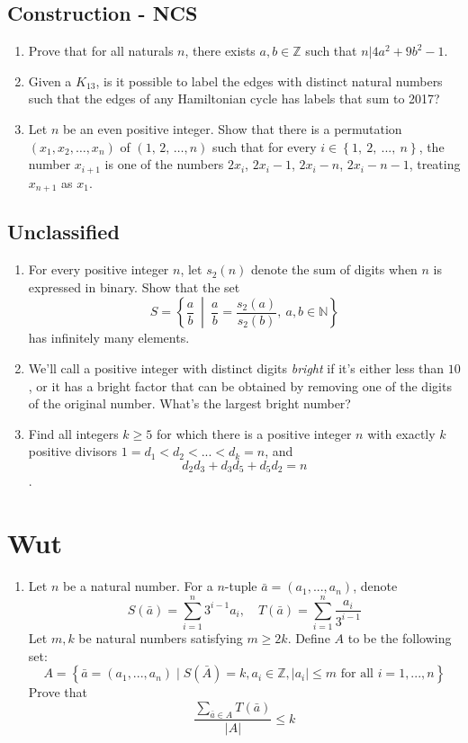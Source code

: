 \documentclass[a4paper]{article}
\newcommand{\sct}{\section}
\newcommand{\ssct}{\subsection}
\newcommand{\be}{\begin{enumerate}}
\newcommand{\ee}{\end{enumerate}}
\begin{document}
\ssct*{Construction - NCS}
\be
	\item Prove that for all naturals $n$, there exists $a,b\in\mathbb{Z}$ such that $n|4a^2+9b^2-1$.

    \item Given a $K_{13}$, is it possible to label the edges with distinct natural numbers such that the edges of any Hamiltonian cycle has labels that sum to 2017?

    \item Let $n$ be an even positive integer. Show that there is a permutation $\left(x_{1},x_{2},\ldots,x_{n}\right)$ of $\left(1,\,2,\,\ldots,n\right)$ such that for every $i\in\left\{1,\ 2,\ ...,\ n\right\}$, the number $x_{i+1}$ is one of the numbers $2x_{i}$, $2x_{i}-1$, $2x_{i}-n$, $2x_{i}-n-1$, treating $x_{n+1}$ as $x_{1}$.
\ee
\ssct*{Unclassified}
\be
    \item For every positive integer $n$, let $s_2(n)$ denote the sum of digits when $n$ is expressed in binary. Show that the set
    $$S = \left\{ \frac{a}{b} \ \middle\vert \ \frac{a}{b}=\frac{s_2(a)}{s_2(b)},\ a,b\in \mathbb{N} \right\}$$ 
    has infinitely many elements.

    \item We'll call a positive integer with distinct digits \textit{bright} if it's either less than $10$, or it has a bright factor that can be obtained by removing one of the digits of the original number. What's the largest bright number?

    \item Find all integers $k\ge 5$ for which there is a positive integer $n$ with exactly $k$ positive divisors $1=d_1<d_2<...<d_k=n$, and $$d_2d_3+d_3d_5+d_5d_2=n$$.
\ee

\sct*{Wut}
\be
	\item Let $n$ be a natural number. For a $n$-tuple $\bar{a}= (a_1,...,a_n)$, denote $$S(\bar{a}) = \sum_{i=1}^n3^{i-1}a_i,\quad T(\bar{a}) = \sum_{i=1}^n \frac{a_i}{3^{i-1}}$$
    Let $m,k$ be natural numbers satisfying $m\ge 2k$. Define $A$ to be the following set:
    $$A=\left\{ \bar{a} = (a_1,...,a_n) \mid S(\bar{A})=k, a_i\in \mathbb{Z}, |a_i|\le m \text{ for all } i=1,...,n\right\}$$
    Prove that $$\frac{\sum_{\bar{a}\in A} T(\bar{a})}{|A|}\le k$$
\ee
\end{document}
